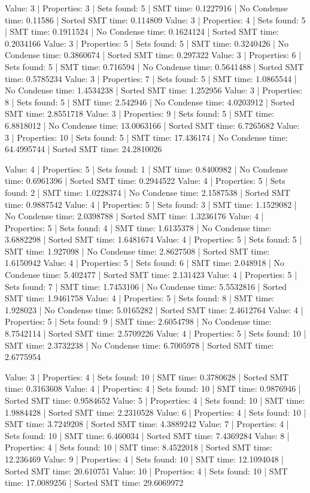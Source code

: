 \documentclass[pageno]{jpaper}
\begin{document}
Value: 3 | Properties: 3 | Sets found: 5 | SMT time: 0.1227916 | No Condense time: 0.11586 | Sorted SMT time: 0.114809
Value: 3 | Properties: 4 | Sets found: 5 | SMT time: 0.1911524 | No Condense time: 0.1624124 | Sorted SMT time: 0.2034166
Value: 3 | Properties: 5 | Sets found: 5 | SMT time: 0.3240426 | No Condense time: 0.3860674 | Sorted SMT time: 0.297322
Value: 3 | Properties: 6 | Sets found: 5 | SMT time: 0.716594 | No Condense time: 0.5641488 | Sorted SMT time: 0.5785234
Value: 3 | Properties: 7 | Sets found: 5 | SMT time: 1.0865544 | No Condense time: 1.4534238 | Sorted SMT time: 1.252956
Value: 3 | Properties: 8 | Sets found: 5 | SMT time: 2.542946 | No Condense time: 4.0203912 | Sorted SMT time: 2.8551718
Value: 3 | Properties: 9 | Sets found: 5 | SMT time: 6.8818012 | No Condense time: 13.0063166 | Sorted SMT time: 6.7265682
Value: 3 | Properties: 10 | Sets found: 5 | SMT time: 17.436174 | No Condense time: 64.4995744 | Sorted SMT time: 24.2810026


Value: 4 | Properties: 5 | Sets found: 1 | SMT time: 0.8400982 | No Condense time: 0.6961396 | Sorted SMT time: 0.2944522
Value: 4 | Properties: 5 | Sets found: 2 | SMT time: 1.0228374 | No Condense time: 2.1587538 | Sorted SMT time: 0.9887542
Value: 4 | Properties: 5 | Sets found: 3 | SMT time: 1.1529082 | No Condense time: 2.0398788 | Sorted SMT time: 1.3236176
Value: 4 | Properties: 5 | Sets found: 4 | SMT time: 1.6135378 | No Condense time: 3.6882298 | Sorted SMT time: 1.6481674
Value: 4 | Properties: 5 | Sets found: 5 | SMT time: 1.927098 | No Condense time: 2.8627508 | Sorted SMT time: 1.6150942
Value: 4 | Properties: 5 | Sets found: 6 | SMT time: 2.048918 | No Condense time: 5.402477 | Sorted SMT time: 2.131423
Value: 4 | Properties: 5 | Sets found: 7 | SMT time: 1.7453106 | No Condense time: 5.5532816 | Sorted SMT time: 1.9461758
Value: 4 | Properties: 5 | Sets found: 8 | SMT time: 1.928023 | No Condense time: 5.0165282 | Sorted SMT time: 2.4612764
Value: 4 | Properties: 5 | Sets found: 9 | SMT time: 2.6054798 | No Condense time: 8.7542114 | Sorted SMT time: 2.5709226
Value: 4 | Properties: 5 | Sets found: 10 | SMT time: 2.3732238 | No Condense time: 6.7005978 | Sorted SMT time: 2.6775954


Value: 3 | Properties: 4 | Sets found: 10 | SMT time: 0.3780628 | Sorted SMT time: 0.3163608
Value: 4 | Properties: 4 | Sets found: 10 | SMT time: 0.9876946 | Sorted SMT time: 0.9584652
Value: 5 | Properties: 4 | Sets found: 10 | SMT time: 1.9884428 | Sorted SMT time: 2.2310528
Value: 6 | Properties: 4 | Sets found: 10 | SMT time: 3.7249208 | Sorted SMT time: 4.3889242
Value: 7 | Properties: 4 | Sets found: 10 | SMT time: 6.460034 | Sorted SMT time: 7.4369284
Value: 8 | Properties: 4 | Sets found: 10 | SMT time: 8.4522018 | Sorted SMT time: 12.236469
Value: 9 | Properties: 4 | Sets found: 10 | SMT time: 12.1094048 | Sorted SMT time: 20.610751
Value: 10 | Properties: 4 | Sets found: 10 | SMT time: 17.0089256 | Sorted SMT time: 29.6069972
\end{document}
